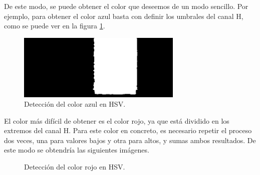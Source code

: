 De este modo, se puede obtener el color que deseemos de un modo sencillo. Por ejemplo, para obtener el color azul basta con definir los umbrales del canal H, como se puede ver en la figura \ref{azulhsv}.\\
\begin{figure}[h]
\centering
\includegraphics[width=0.7\textwidth]{images/azul.jpg}%
\caption{Detección del color azul en HSV.}
\label{azulhsv}
\end{figure}
\FloatBarrier
El color más difícil de obtener es el color rojo, ya que está dividido en los extremos del canal H. Para este color en concreto, es necesario repetir el proceso dos veces, una para valores bajos y otra para altos, y sumas ambos resultados. De este modo se obtendría las siguientes imágenes.\\

\begin{figure}[h]
\centering
{}

\caption{Detección del color rojo en HSV.}

\end{figure}
\FloatBarrier

